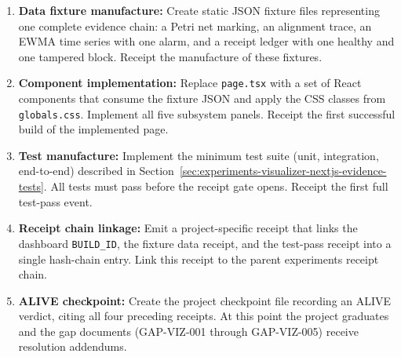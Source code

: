 \begin{enumerate}
  \item \textbf{Data fixture manufacture:} Create static JSON fixture files representing
        one complete evidence chain: a Petri net marking, an alignment trace, an EWMA
        time series with one alarm, and a receipt ledger with one healthy and one tampered
        block. Receipt the manufacture of these fixtures.

  \item \textbf{Component implementation:} Replace \texttt{page.tsx} with a set of React
        components that consume the fixture JSON and apply the CSS classes from
        \texttt{globals.css}. Implement all five subsystem panels. Receipt the first
        successful build of the implemented page.

  \item \textbf{Test manufacture:} Implement the minimum test suite (unit, integration,
        end-to-end) described in Section~\ref{sec:experiments-visualizer-nextjs-evidence-tests}.
        All tests must pass before the receipt gate opens. Receipt the first full test-pass event.

  \item \textbf{Receipt chain linkage:} Emit a project-specific receipt that links the
        dashboard \texttt{BUILD\_ID}, the fixture data receipt, and the test-pass receipt
        into a single hash-chain entry. Link this receipt to the parent experiments receipt chain.

  \item \textbf{ALIVE checkpoint:} Create the project checkpoint file recording an ALIVE
        verdict, citing all four preceding receipts. At this point the project graduates
        and the gap documents (GAP-VIZ-001 through GAP-VIZ-005) receive resolution addendums.
\end{enumerate}
